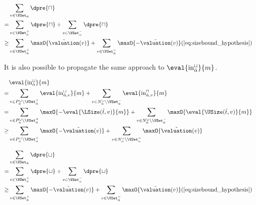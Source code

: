 \begin{equation} \label{eq:d_upper_reduction}
  \begin{split} 
  & \sum_{v \in \VSet_{\hat{\alpha}}} \dpre{\sqcap} \\
  = & \sum_{v \in \VSet^+_{\hat{\alpha}}} \dpre{\sqcap} + \sum_{v \in \VSet^-_{\hat{\alpha}}} \dpre{\sqcap} \\
  \geq & \sum_{v \in \VSet^+_{\hat{\alpha}}} \maxO{\tilde{\valuation}(v)} + \sum_{v \in \VSet^-_{\hat{\alpha}}} \maxO{-\tilde{\valuation}(v)} (\ref{eq:sizebound_hypothesis}) \\
  \end{split}      
\end{equation}

It is also possible to propagate the same approach to $\eval{\text{in}^\sqcup_{\hat{\alpha}}}{m}$.

\begin{equation} \label{eq:input_rv_reduction_lower}
  \begin{split}
  & \eval{\text{in}^\sqcup_{\hat{\alpha}}}{m} \\
  = & \sum_{v \in P_{\hat{\alpha}}^\sqcup \setminus \VSet^+_{\hat{\alpha}}} \eval{\text{in}^\sqcup_{{\hat{\alpha}},v}}{m}
    + \sum_{v \in N_{\hat{\alpha}}^\sqcup \setminus \VSet^-_{\hat{\alpha}}} \eval{\text{in}^\sqcap_{{\hat{\alpha}},v}}{m} \\
  = & \sum_{v \in P_{\hat{\alpha}}^\sqcup \setminus \VSet^+_{\hat{\alpha}}} \maxO{-\eval{\LSize(\tilde{t}, v)}{m}}
    + \sum_{v \in N_{\hat{\alpha}}^\sqcup \setminus \VSet^-_{\hat{\alpha}}} \maxO{\eval{\USize(\tilde{t}, v)}{m}} \\
  \geq & \sum_{v \in P_{\hat{\alpha}}^\sqcup \setminus \VSet^+_{\hat{\alpha}}} \maxO{-\tilde{\valuation}(v)}
    + \sum_{v \in N_{\hat{\alpha}}^\sqcup \setminus \VSet^-_{\hat{\alpha}}} \maxO{\tilde{\valuation}(v)} \\
  \end{split}
\end{equation}

\begin{equation} \label{eq:d_lower_reduction}
  \begin{split} 
  & \sum_{v \in \VSet_{\hat{\alpha}}} \dpre{\sqcup} \\
  = & \sum_{v \in \VSet^+_{\hat{\alpha}}} \dpre{\sqcup} + \sum_{v \in \VSet^-_{\hat{\alpha}}} \dpre{\sqcup} \\
  \geq & \sum_{v \in \VSet^+_{\hat{\alpha}}} \maxO{-\tilde{\valuation}(v)} + \sum_{v \in \VSet^-_{\hat{\alpha}}} \maxO{\tilde{\valuation}(v)} (\ref{eq:sizebound_hypothesis}) \\
  \end{split}      
\end{equation}

